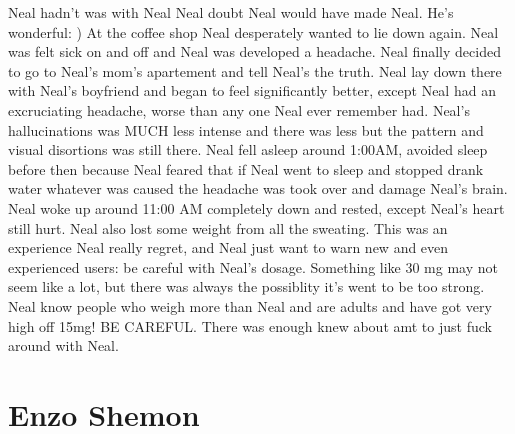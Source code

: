 \documentclass[12pt]{book}
\begin{document}
Neal hadn't was with Neal Neal doubt Neal would have made Neal. He's wonderful: ) At the coffee shop Neal desperately wanted to lie down again. Neal was felt sick on and off and Neal was developed a headache. Neal finally decided to go to Neal's mom's apartement and tell Neal's the truth. Neal lay down there with Neal's boyfriend and began to feel significantly better, except Neal had an excruciating headache, worse than any one Neal ever remember had. Neal's hallucinations was MUCH less intense and there was less but the pattern and visual disortions was still there. Neal fell asleep around 1:00AM, avoided sleep before then because Neal feared that if Neal went to sleep and stopped drank water whatever was caused the headache was took over and damage Neal's brain. Neal woke up around 11:00 AM completely down and rested, except Neal's heart still hurt. Neal also lost some weight from all the sweating. This was an experience Neal really regret, and Neal just want to warn new and even experienced users: be careful with Neal's dosage. Something like 30 mg may not seem like a lot, but there was always the possiblity it's went to be too strong. Neal know people who weigh more than Neal and are adults and have got very high off 15mg! BE CAREFUL. There was enough knew about amt to just fuck around with Neal.



\chapter{Enzo Shemon}
\end{document}
